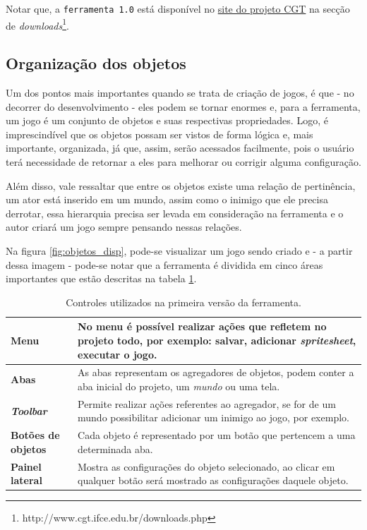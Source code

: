 \documentclass[12pt,twoside,openright,a4paper,english,brazil,sumario=tradicional]{abntex2}
\begin{document}
Notar que, a \texttt{ferramenta 1.0} está disponível no \href{http://www.cgt.ifce.edu.br/downloads.php}{site do projeto CGT} na secção de \emph{downloads}\footnote{http://www.cgt.ifce.edu.br/downloads.php}.

\subsection{Organização dos objetos}
Um dos pontos mais importantes quando se trata de criação de jogos, é que - no decorrer do desenvolvimento - eles podem se tornar enormes e, para a ferramenta, um jogo é um conjunto de objetos e suas respectivas propriedades. Logo, é imprescindível que os objetos possam ser vistos de forma lógica e, mais importante, organizada, já que, assim, serão acessados facilmente, pois o usuário terá necessidade de retornar a eles para melhorar ou corrigir alguma configuração.

Além disso, vale ressaltar que entre os objetos existe uma relação de pertinência, um ator está inserido em um mundo, assim como o inimigo que ele precisa derrotar, essa hierarquia precisa ser levada em consideração na ferramenta e o autor criará um jogo sempre pensando nessas relações.

Na figura \ref{fig:objetos_disp}, pode-se visualizar um jogo sendo criado e - a partir dessa imagem - pode-se notar que a ferramenta é dividida em cinco áreas importantes que estão descritas na tabela \ref{table:ferramenta_areas}. 

\begin{table}[h]
   \centering
   \begin{tabular}{| l | p{8cm} |}
      \hline
      \textbf{Menu} & No menu é possível realizar ações que refletem no projeto todo, por exemplo: salvar, adicionar \emph{spritesheet}, executar o jogo. \\
      \hline
      \textbf{Abas} & As abas representam os agregadores de objetos, podem conter a aba inicial do projeto, um \emph{mundo} ou uma tela. \\
      \hline
      \textbf{\emph{Toolbar}} & Permite realizar ações referentes ao agregador, se for de um mundo possibilitar adicionar um inimigo ao jogo, por exemplo. \\
      \hline
      \textbf{Botões de objetos} & Cada objeto é representado por um botão que pertencem a uma determinada aba. \\
      \hline
      \textbf{Painel lateral} & Mostra as configurações do objeto selecionado, ao clicar em qualquer botão será mostrado as configurações daquele objeto.  \\
      \hline
   \end{tabular}
   \caption{Controles utilizados na primeira versão da ferramenta.}
   \label{table:ferramenta_areas}
\end{table}
\end{document}
